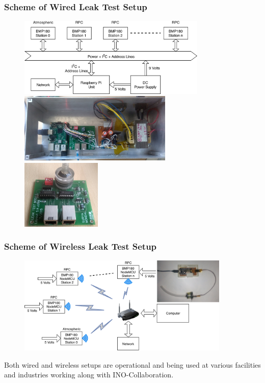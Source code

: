\documentclass{beamer}
\begin{document}
\begin{frame}
  \frametitle{Scheme of Wired Leak Test Setup}
  \begin{figure}[!h]
    \includegraphics[width=0.8\textwidth]{leaktest_setup.png}\\
    \includegraphics[width=0.65\textwidth]{pc2.jpg}
    \includegraphics[width=0.34\textwidth]{pc3.jpg}
  \end{figure}
\end{frame}

\begin{frame}
  \frametitle{Scheme of Wireless Leak Test Setup}
  \begin{figure}[!h]
    \includegraphics[width=0.9\textwidth]{leaktest_setup_wifi_all.png}
  \end{figure}
  Both wired and wireless setups are operational and being used at
  various facilities and industries working along with
  INO-Collaboration.
\end{frame}
\end{document}
